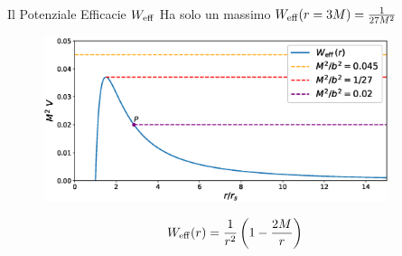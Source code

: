 \begin{frame}{Il Potenziale Efficacie $W_{\rm eff}$}
    Ha solo un massimo $W_{\rm eff} (r = 3M) = \frac{1}{27 M^2}$

    \begin{figure}
        \centering
        \includegraphics[width=0.9\textwidth]{Figures/ch1/W_eff_vs_b.eps}
    \end{figure}
    
    \begin{equation*}
        W_{\rm eff} (r) = \frac{1}{r^2} \left( 1 - \frac{2M}{r} \right)
    \end{equation*}

\end{frame}


